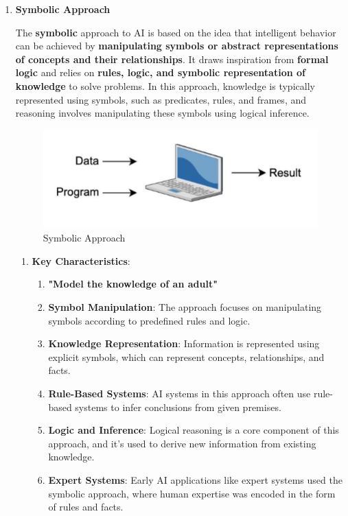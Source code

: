 \begin{enumerate}
    \item \textbf{Symbolic Approach}
    \begin{definition}
    The \textbf{symbolic} approach to AI is based on the idea that intelligent behavior can be achieved by \textbf{manipulating symbols or abstract representations of concepts and their relationships}. It draws inspiration from \textbf{formal logic} and relies on \textbf{rules, logic, and symbolic representation of knowledge} to solve problems. In this approach, knowledge is typically represented using symbols, such as predicates, rules, and frames, and reasoning involves manipulating these symbols using logical inference.
\end{definition}
\begin{figure}[h!t]
    \centering
    \includegraphics[width=0.5\linewidth]{symbolic.png}
    \caption{Symbolic Approach}
    \label{fig:enter-label}
\end{figure}
\begin{enumerate}
    \item \textbf{Key Characteristics}:
    \begin{enumerate}
        \item \textbf{"Model the knowledge of an adult"}
        \item \textbf{Symbol Manipulation}: The approach focuses on manipulating symbols according to predefined rules and logic.
        \item \textbf{Knowledge Representation}: Information is represented using explicit symbols, which can represent concepts, relationships, and facts.
        \item \textbf{Rule-Based Systems}: AI systems in this approach often use rule-based systems to infer conclusions from given premises.
        \item \textbf{Logic and Inference}: Logical reasoning is a core component of this approach, and it's used to derive new information from existing knowledge.
        \item \textbf{Expert Systems}: Early AI applications like expert systems used the symbolic approach, where human expertise was encoded in the form of rules and facts.
    \end{enumerate}

\end{enumerate}
\end{enumerate}
